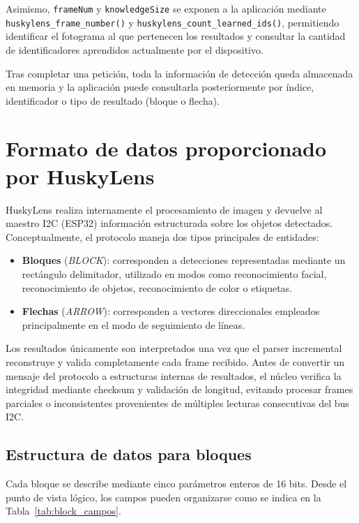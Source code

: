 \documentclass{prgrado}
\begin{document}
Asimismo, \texttt{frameNum} y \texttt{knowledgeSize} se exponen a la aplicación
mediante \texttt{huskylens\_frame\_number()} y
\texttt{huskylens\_count\_learned\_ids()}, permitiendo identificar el fotograma
al que pertenecen los resultados y consultar la cantidad de identificadores
aprendidos actualmente por el dispositivo.

Tras completar una petición, toda la información de detección queda almacenada
en memoria y la aplicación puede consultarla posteriormente por índice,
identificador o tipo de resultado (bloque o flecha).

\section{Formato de datos proporcionado por HuskyLens}

HuskyLens realiza internamente el procesamiento de imagen y devuelve al maestro
I2C (ESP32) información estructurada sobre los objetos detectados. Conceptualmente,
el protocolo maneja dos tipos principales de entidades:

\begin{itemize}
    \item \textbf{Bloques} (\emph{BLOCK}): corresponden a detecciones representadas
    mediante un rectángulo delimitador, utilizado en modos como reconocimiento
    facial, reconocimiento de objetos, reconocimiento de color o etiquetas.

    \item \textbf{Flechas} (\emph{ARROW}): corresponden a vectores direccionales
    empleados principalmente en el modo de seguimiento de líneas.
\end{itemize}

Los resultados únicamente son interpretados una vez que el parser incremental
reconstruye y valida completamente cada frame recibido. Antes de convertir un
mensaje del protocolo a estructuras internas de resultados, el núcleo verifica
la integridad mediante checksum y validación de longitud, evitando procesar
frames parciales o inconsistentes provenientes de múltiples lecturas consecutivas
del bus I2C.

\subsection{Estructura de datos para bloques}

Cada bloque se describe mediante cinco parámetros enteros de 16 bits. Desde el
punto de vista lógico, los campos pueden organizarse como se indica en la
Tabla~\ref{tab:block_campos}.
\end{document}
